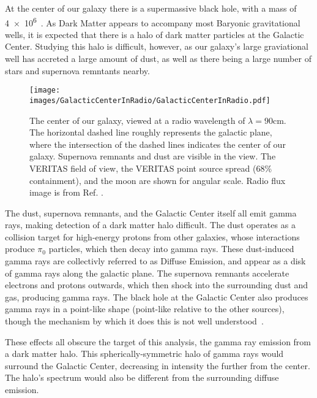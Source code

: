   At the center of our galaxy there is a supermassive black hole, with a mass of \SI{4e6}{\Msol{}}~\cite{sgra_massdist}.
  As Dark Matter appears to accompany most Baryonic gravitational wells, it is expected that there is a halo of dark matter particles at the Galactic Center.
  Studying this halo is difficult, however, as our galaxy's large graviational well has accreted a large amount of dust, as well as there being a large number of stars and supernova remntants nearby.

  \begin{figure}[ht]
    \centering
    \texttt{[image: images/GalacticCenterInRadio/GalacticCenterInRadio.pdf]}
    \caption[Galactic Center in Radio]{
      The center of our galaxy, viewed at a radio wavelength of $\lambda=90\text{cm}$.
      The horizontal dashed line roughly represents the galactic plane, where the intersection of the dashed lines indicates the center of our galaxy.
      Supernova remnants and dust are visible in the view.
      The VERITAS field of view, the VERITAS point source spread (68\% containment), and the moon are shown for angular scale.
      Radio flux image is from Ref. \cite{galactic_center_in_radio}.}
    \label{fig_gc_radio}
  \end{figure}

  The dust, supernova remnants, and the Galactic Center itself all emit gamma rays, making detection of a dark matter halo difficult.
  The dust operates as a collision target for high-energy protons from other galaxies, whose interactions produce $\pi_0$ particles, which then decay into gamma rays.
  These dust-induced gamma rays are collectivly referred to as Diffuse Emission, and appear as a disk of gamma rays along the galactic plane.
  The supernova remnants accelerate electrons and protons outwards, which then shock into the surrounding dust and gas, producing gamma rays.
  The black hole at the Galactic Center also produces gamma rays in a point-like shape (point-like relative to the other sources), though the mechanism by which it does this is not well understood~\cite{gal_cent_still_undetermined}.

  These effects all obscure the target of this analysis, the gamma ray emission from a dark matter halo.
  This spherically-symmetric halo of gamma rays would surround the Galactic Center, decreasing in intensity the further from the center.
  The halo's spectrum would also be different from the surrounding diffuse emission.

